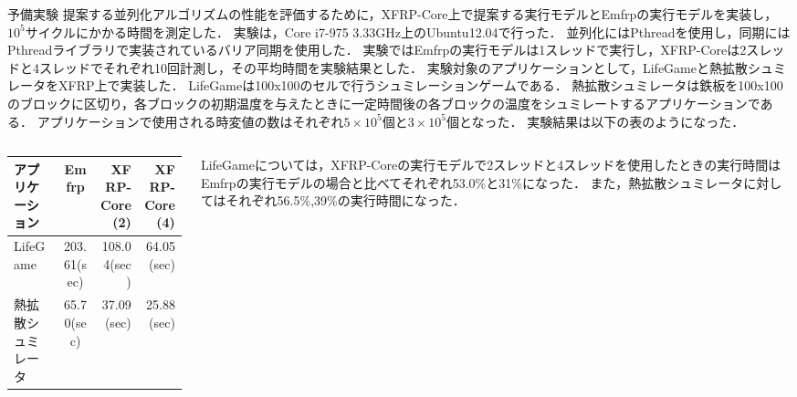 \documentclass[dvipdfmx,final,t,10pt]{beamer}
\begin{document}
\begin{frame}[fragile]
    \begin{block}{予備実験}
        \vskip 0.3cm
            提案する並列化アルゴリズムの性能を評価するために，XFRP-Core上で提案する実行モデルとEmfrpの実行モデルを実装し，$10^5$サイクルにかかる時間を測定した．
            実験は，Core i7-975 3.33GHz上のUbuntu12.04で行った．
            並列化にはPthreadを使用し，同期にはPthreadライブラリで実装されているバリア同期を使用した．
            実験ではEmfrpの実行モデルは1スレッドで実行し，XFRP-Coreは2スレッドと4スレッドでそれぞれ10回計測し，その平均時間を実験結果とした．
            実験対象のアプリケーションとして，LifeGameと熱拡散シュミレータをXFRP上で実装した．
            LifeGameは100x100のセルで行うシュミレーションゲームである．
            熱拡散シュミレータは鉄板を100x100のブロックに区切り，各ブロックの初期温度を与えたときに一定時間後の各ブロックの温度をシュミレートするアプリケーションである．
            アプリケーションで使用される時変値の数はそれぞれ$5\times10^5$個と$3\times10^5$個となった．
            実験結果は以下の表のようになった．
        \begin{columns}
            \begin{column}{0.55\textwidth}
                \vskip -0.3cm
                \begin{table}
                    \begin{tabular}{|l|c|r|r|} \hline
                        アプリケーション & Emfrp & XFRP-Core(2) & XFRP-Core(4) \\ \hline
                        LifeGame & 203.61(sec) & 108.04(sec) & 64.05(sec) \\ \hline
                        熱拡散シュミレータ & 65.70(sec) & 37.09(sec) & 25.88(sec) \\ \hline
                    \end{tabular}
                \end{table}
            \end{column}
            \begin{column}{0.4\textwidth}
                LifeGameについては，XFRP-Coreの実行モデルで2スレッドと4スレッドを使用したときの実行時間はEmfrpの実行モデルの場合と比べてそれぞれ53.0\%と31\%になった．
                また，熱拡散シュミレータに対してはそれぞれ56.5\%,39\%の実行時間になった．
            \end{column}
        \end{columns} 
        \vskip -0.2cm
    \end{block}
\end{frame}
\end{document}
